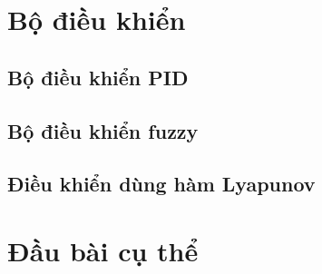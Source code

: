     \section{Bộ điều khiển}
    \subsection{Bộ điều khiển PID}

    \subsection{Bộ điều khiển fuzzy}

    \subsection{Điều khiển dùng hàm Lyapunov}



    \section{Đầu bài cụ thể}





    